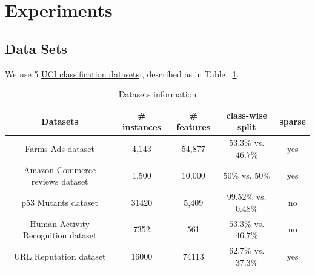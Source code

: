 \section{Experiments}
\label{sec:experiments}

\subsection{Data Sets}


We use 5 \href{http://archive.ics.uci.edu/ml/datasets.html}{UCI classification
datasets}:, described as in Table ~\ref{tb:datasets}.

\begin{table}

\begin{tabular}{| c | c |  c | c | c |}
  \hline
  Datasets & \# instances & \# features & class-wise split & sparse\\
  \hline
  Farms Ads dataset & 4,143 & 54,877 & $53.3\%$ vs. $46.7\%$ & yes\\
  \hline
  Amazon Commerce reviews dataset & 1,500 & 10,000 & $50\%$ vs. $50\%$ & yes \\
  \hline
  p53 Mutants dataset & 31420 & 5,409 & $99.52\%$ vs.$0.48\%$  & no\\
  \hline
  Human Activity Recognition dataset & 7352 & 561 & $53.3\%$ vs. $46.7\%$  & no\\
  \hline
  URL Reputation dataset\footnotemark[1] & 16000 & 74113 & $62.7\%$ vs. $37.3\%$ & yes \\
  \hline
\end{tabular}
\caption{Datasets information}
\label{tb:datasets}
\end{table}

